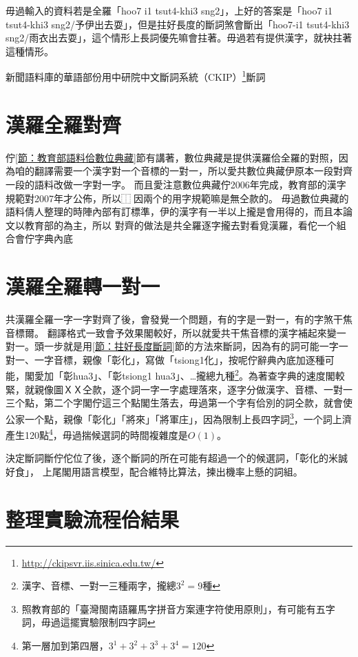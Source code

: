 \documentclass[final,oneside,onecolumn,12pt,a4paper]{book}%
\begin{document}
毋過輸入的資料若是全羅「hoo7 i1 tsut4-khi3 sng2」，上好的答案是「hoo7 i1 tsut4-khi3 sng2/予伊出去耍」，但是拄好長度的斷詞煞會斷出「hoo7-i1 tsut4-khi3 sng2/雨衣出去耍」，這个情形上長詞優先嘛會拄著。毋過若有提供漢字，就袂拄著這種情形。

新聞語料庫的華語部份用中研院中文斷詞系統（CKIP）\footnote{\url{http://ckipsvr.iis.sinica.edu.tw/}}斷詞

\section{漢羅全羅對齊}
\label{節：漢羅全羅對齊}
佇\ref{節：教育部語料佮數位典藏}節有講著，數位典藏是提供漢羅佮全羅的對照，因為咱的翻譯需要一个漢字對一个音標的一對一，所以愛共數位典藏伊原本一段對齊一段的語料改做一字對一字。
而且愛注意數位典藏佇2006年完成，教育部的漢字規範對2007年才公佈，所以⿰因兩个的用字規範嘛是無仝款的。
毋過數位典藏的語料倩人整理的時陣內部有訂標準，伊的漢字有一半以上攏是會用得的，而且本論文以教育部的為主，所以
對齊的做法是共全羅逐字攏去對看覓漢羅，看佗一个組合會佇字典內底




\section{漢羅全羅轉一對一}
\label{節：漢羅全羅轉一對一}
共漢羅全羅一字一字對齊了後，會發覺一个問題，有的字是一對一，有的字煞干焦音標爾。
翻譯格式一致會予效果閣較好，所以就愛共干焦音標的漢字補起來變一對一。頭一步就是用\ref{節：拄好長度斷詞}節的方法來斷詞，因為有的詞可能一字一對一、一字音標，親像「彰化」，寫做「tsiong1化」，按呢佇辭典內底加逐種可能，閣愛加「彰hua3」、「彰tsiong1 hua3」、…攏總九種\footnote{漢字、音標、一對一三種兩字，攏總$3^{2}=9$種}。為著查字典的速度閣較緊，就親像圖ＸＸ仝款，逐个詞一字一字處理落來，逐字分做漢字、音標、一對一三个點，第二个字閣佇這三个點閣生落去，毋過第一个字有佮別的詞仝款，就會使公家一个點，親像「彰化」「將來」「將軍庄」，因為限制上長四字詞\footnote{照教育部的「臺灣閩南語羅馬字拼音方案連字符使用原則」，有可能有五字詞，毋過這擺實驗限制四字詞}，一个詞上濟產生120點\footnote{第一層加到第四層，$3^{1}+3^{2}+3^{3}+3^{4}=120$}，毋過揣候選詞的時間複雜度是$O(1)$。

決定斷詞斷佇佗位了後，逐个斷詞的所在可能有超過一个的候選詞，「彰化的米誠好食」，
上尾閣用語言模型，配合維特比算法，揀出機率上懸的詞組。

\section{整理實驗流程佮結果}
\label{節：整理實驗流程佮結果}
\end{document}
